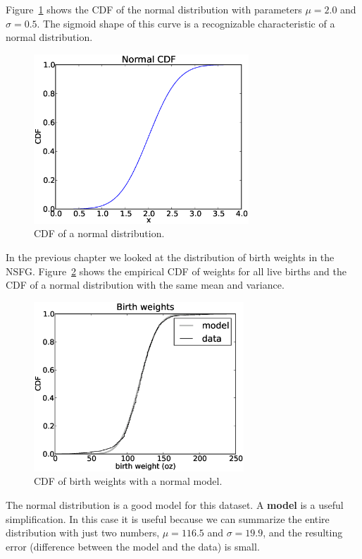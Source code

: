 \documentclass[12pt]{book}
\begin{document}
Figure~\ref{normal_cdf} shows the CDF of the normal distribution
with parameters $\mu=2.0$ and $\sigma=0.5$.  The sigmoid shape of
this curve is a recognizable characteristic of a normal distribution.

\begin{figure}
\centerline{\includegraphics[height=2.5in]{figs/normal_cdf.eps}}
\caption{CDF of a normal distribution.}
\label{normal_cdf}
\end{figure}

In the previous chapter we looked at the distribution of birth
weights in the NSFG.  Figure~\ref{nsfg_birthwgt_model} shows the
empirical CDF of weights for all live births and the CDF of
a normal distribution with the same mean and variance.


\begin{figure}
\centerline{\includegraphics[height=2.5in]{figs/nsfg_birthwgt_model.eps}}
\caption{CDF of birth weights with a normal model.}
\label{nsfg_birthwgt_model}
\end{figure}

The normal distribution is a good model for this dataset.  A {\bf
  model} is a useful simplification.  In this case it is useful
because we can summarize the entire distribution with just two
numbers, $\mu=116.5$ and $\sigma=19.9$, and the resulting error
(difference between the model and the data) is small.
\end{document}
